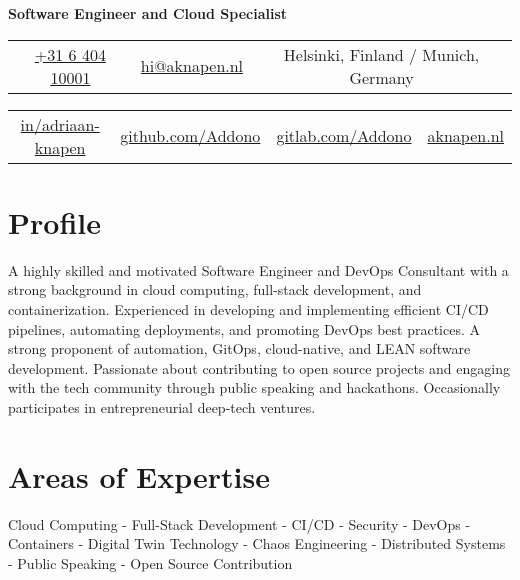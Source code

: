 \documentclass[11pt,a4paper,sans]{moderncv}
\begin{document}
\makecvtitle
\vspace*{-14mm}
\begin{center}\textbf{Software Engineer and Cloud Specialist}\end{center}

\begin{center}
	\begin{tabular}{ c c c }
		\faMobile\enspace 
		\href{tel:+31640410001}{+31 6 404 10001}
		\enspace & \enspace 
		\href{mailto:hi@aknapen.nl}{hi@aknapen.nl}
		\enspace & \enspace 
		\faHome\enspace Helsinki, Finland / Munich, Germany
	\end{tabular}
			
	\begin{tabular}{ c c c c }
		\faLinkedin\enspace \color{blue} \href{https://www.linkedin.com/in/adriaan-knapen/}{in/adriaan-knapen} &
		\enspace\enspace\faGithub\enspace \color{blue} \href{https://github.com/Addono}{github.com/Addono} & \enspace\enspace\faGitlab\enspace \color{blue} \href{https://gitlab.com/Addono}{gitlab.com/Addono} & \enspace\enspace\faHome\enspace \color{blue} \href{https://aknapen.nl}{aknapen.nl} 
	\end{tabular}
\end{center}

\section{Profile}
{A highly skilled and motivated Software Engineer and DevOps Consultant with a strong background in cloud computing, full-stack development, and containerization. Experienced in developing and implementing efficient CI/CD pipelines, automating deployments, and promoting DevOps best practices. A strong proponent of automation, GitOps, cloud-native, and LEAN software development. Passionate about contributing to open source projects and engaging with the tech community through public speaking and hackathons. Occasionally participates in entrepreneurial deep-tech ventures.}

\section{Areas of Expertise}
{Cloud Computing - Full-Stack Development - CI/CD - Security - DevOps - Containers - Digital Twin Technology - Chaos Engineering - Distributed Systems - Public Speaking - Open Source Contribution}
\end{document}
